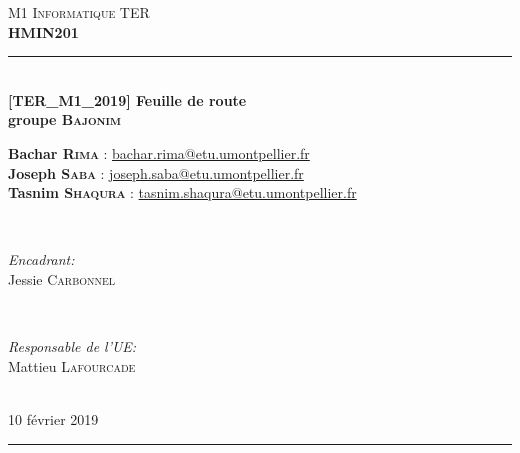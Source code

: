 \documentclass[12pt,a4paper]{report}
\newcommand{\HRule}{\rule{\linewidth}{0.5mm}} %
\begin{document}
\centering

\textsc{\large M1 Informatique TER}\\[0.25cm]
\textsc{\large \textbf{HMIN201}}\\[0.25cm]

\HRule \\[0.4cm]
{ \large \bfseries [TER\_M1\_2019] Feuille de route}\\[0.4cm]
{ \large \bfseries groupe \textsc{Bajonim}}\\[0.4cm]
\begin{minipage}{\textwidth}
\centering
\small
\textbf{Bachar \textsc{Rima}} : \href{mailto:bachar.rima@etu.umontpellier.fr}{bachar.rima@etu.umontpellier.fr}\\ %
\textbf{Joseph \textsc{Saba}} : \href{mailto:joseph.saba@etu.umontpellier.fr}{joseph.saba@etu.umontpellier.fr}\\ %
\textbf{Tasnim \textsc{Shaqura}} : \href{mailto:tasnim.shaqura@etu.umontpellier.fr}{tasnim.shaqura@etu.umontpellier.fr}\\ %
\end{minipage} \\[0.4cm]

\begin{minipage}[b]{0.4\textwidth}
\begin{flushleft} \small
\emph{Encadrant:} \\
Jessie \textsc{Carbonnel} %
\end{flushleft}
\end{minipage}
~
\begin{minipage}[b]{0.4\textwidth}
\begin{flushright} \small
\emph{Responsable de l'UE:} \\
Mattieu \textsc{Lafourcade} %
\end{flushright}
\end{minipage}\\[0.4cm]
{ \large 10 février 2019}\\[0.25cm]
\HRule

\end{document}
